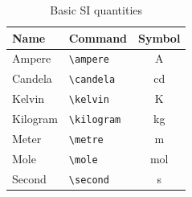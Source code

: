 \begin{table}
	\centering
	\captionsetup{justification=centering} %
	\caption{Basic SI quantities}%
	\begin{tabular}{llc}
		\toprule
		Name 	& 	Command 	& 	Symbol        \\
		\midrule
		Ampere 	 & \verb|\ampere| 	&\si{\ampere}\\
		Candela  & \verb|\candela| 	& \si{\candela} \\
		Kelvin 	 & \verb|\kelvin| 	&\si{\kelvin}\\
		Kilogram & \verb|\kilogram| & \si{\kilogram} \\
		Meter 	 & \verb|\metre| 	&\si{\metre}\\
		Mole 	 & \verb|\mole| 	&\si{\mole}\\
		Second 	 & \verb|\second| 	&\si{\second}\\
		\bottomrule
	\end{tabular}
\end{table}